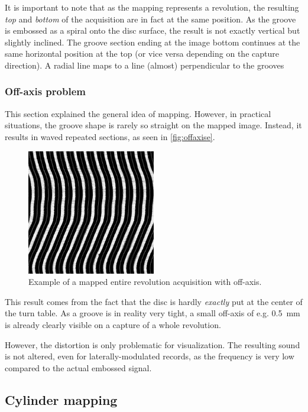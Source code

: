 It is important to note that as the mapping represents a revolution, the resulting \emph{top} and \emph{bottom} of the acquisition are in fact at the same position. As the groove is embossed as a spiral onto the disc surface, the result is not exactly vertical but slightly inclined. The groove section ending at the image bottom continues at the same horizontal position at the top (or vice versa depending on the capture direction). A radial line maps to a line (almost) perpendicular to the grooves

\subsubsection{Off-axis problem}

This section explained the general idea of mapping. However, in practical situations, the groove shape is rarely so straight on the mapped image. Instead, it results in waved repeated sections, as seen in \autoref{fig:offaxise}.

\begin{figure}[!ht]
\centering
\includegraphics[width=0.5\textwidth]{images/off-axis}
\caption{Example of a mapped entire revolution acquisition with off-axis.}
\label{fig:offaxise}
\end{figure}

This result comes from the fact that the disc is hardly \emph{exactly} put at the center of the turn table. As a groove is in reality very tight, a small off-axis of e.g. \SI{0.5}{\milli\metre} is already clearly visible on a capture of a whole revolution.

However, the distortion is only problematic for visualization. The resulting sound is not altered, even for laterally-modulated records, as the frequency is very low compared to the actual embossed signal.

\subsection{Cylinder mapping}

